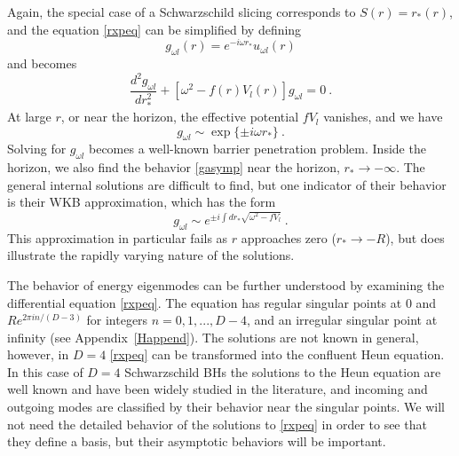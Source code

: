 \documentclass[12pt]{article}
\numberwithin{equation}{section}
\newcommand{\beq}{\begin{equation}}
\newcommand{\eeq}{\end{equation}}
\begin{document}
Again, 
the special case of a Schwarzschild slicing corresponds to $S(r)=r_*(r)$, and  the equation \eqref{rxpeq} can be simplified by defining
\beq\label{rescm}
 g_{\omega l}(r)=e^{-i\omega r_*} u_{\omega l}(r)
\eeq
and becomes
\beq\label{diffeq}
\frac{d^2 g_{\omega l} }{d r_*^2}  + \left[\omega^2-f(r)V_l(r)\right] g_{\omega l} =0\ .
\eeq
At large $r$, or near the horizon, the effective potential $fV_l$ vanishes, and we have 
\beq\label{gasymp}
g_{\omega l}\sim \exp\{\pm i \omega r_*\}\ .
\eeq
Solving for $g_{\omega l}$ becomes a well-known barrier penetration problem.  Inside the horizon, we also find the behavior \eqref{gasymp} near the horizon, $r_*\rightarrow-\infty$.  The general internal solutions are difficult to find, but one indicator of their behavior is their WKB approximation, which has the form
\beq
g_{\omega l} \sim e^{\pm i \int dr_* \sqrt{\omega^2 -fV_l}}\ .
\eeq
This approximation in particular fails as $r$ approaches zero ($r_*\rightarrow-R$), but does illustrate the rapidly varying nature of the solutions.

The behavior of energy eigenmodes can be further understood by examining the differential equation \eqref{rxpeq}. The equation has regular singular points at $0$ and $R e^{2 \pi i n/ (D-3)}$ for integers $n = 0, 1,..., D-4$, and an irregular singular point at infinity (see Appendix~\ref{Happend}). The  solutions are not known in general, however, in $D=4$ \eqref{rxpeq} can be transformed into the confluent Heun equation. In this case of  $D=4$ Schwarzschild BHs the solutions to the Heun equation are well known and have been widely studied in the literature, and incoming and outgoing modes are classified by their behavior near the singular points. We will not need the detailed behavior of the solutions to  \eqref{rxpeq} in order to see that they define a basis, but their asymptotic behaviors will be important.  
\end{document}
